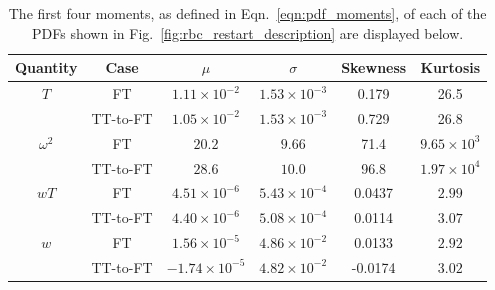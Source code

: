 \documentclass[aps, pre, onecolumn, nofootinbib, notitlepage, groupedaddress, amsfonts, amssymb, amsmath, longbibliography, superscriptaddress]{revtex4-1}
\begin{document}
\begin{table}[t!]
\caption{ 
	The first four moments, as defined in Eqn.~\ref{eqn:pdf_moments}, of each of the PDFs shown in Fig.~\ref{fig:rbc_restart_description} are displayed below.
}
\setlength{\tabcolsep}{12pt}
\label{table:pdf_values}
\begin{center}
\begin{tabularx}{\textwidth}{c c c c c c}
\hline																	
Quantity &	Case	&	$\mu$	&	$\sigma$	&	Skewness	&	Kurtosis \\
\hline
$T$				&	FT			&		$1.11 \times 10^{-2}$	&	$1.53 \times 10^{-3}$	&	0.179		&	26.5 \\
				&	TT-to-FT	&		$1.05 \times 10^{-2}$	&	$1.53 \times 10^{-3}$	&	0.729		&	26.8 \\
\hline
$\omega^2$		&	FT			&		$20.2$					&	$9.66$					&	71.4		&	$9.65\times 10^3$ \\
				&	TT-to-FT	&		$28.6$					&	$10.0$					&	96.8		&	$1.97 \times 10^4$ \\
\hline
$wT$			&	FT			&		$4.51 \times 10^{-6}$	&	$5.43 \times 10^{-4}$	&	0.0437	&	$2.99$ \\
				&	TT-to-FT	&		$4.40 \times 10^{-6}$	&	$5.08 \times 10^{-4}$	&	0.0114	&	$3.07$ \\
\hline
$w$				&	FT			&		$1.56 \times 10^{-5}$	&	$4.86 \times 10^{-2}$	&	0.0133	&	$2.92$ \\
				&	TT-to-FT	&		$-1.74 \times 10^{-5}$	&	$4.82 \times 10^{-2}$	&	-0.0174	&	$3.02$ \\
\hline																	
\end{tabularx}
\end{center}
\end{table}
\end{document}
